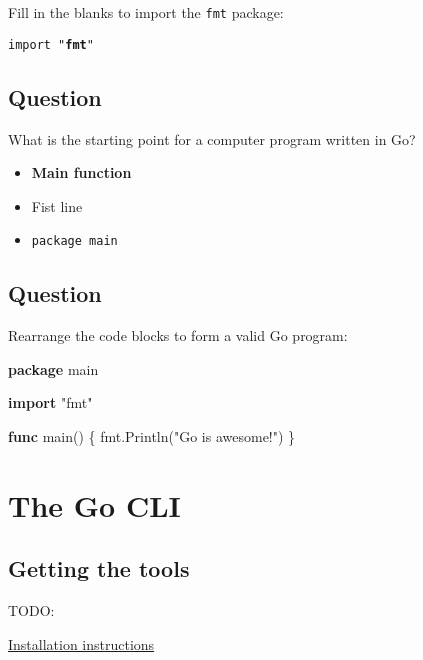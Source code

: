 \documentclass[]{book}
\newenvironment{Shaded}{\begin{snugshade}}{\end{snugshade}}
\newcommand{\KeywordTok}[1]{\textcolor[rgb]{0.13,0.29,0.53}{\textbf{#1}}}
\newcommand{\NormalTok}[1]{#1}
\newcommand{\StringTok}[1]{\textcolor[rgb]{0.31,0.60,0.02}{#1}}
\providecommand{\tightlist}{%
  \setlength{\itemsep}{0pt}\setlength{\parskip}{0pt}}
\begin{document}
Fill in the blanks to import the \texttt{fmt} package:

\texttt{import\ "}\textbf{\texttt{fmt}}\texttt{"}

\hypertarget{question-3}{%
\subsection*{Question}\label{question-3}}

What is the starting point for a computer program written in Go?

\begin{itemize}
\tightlist
\item
  \textbf{Main function}
\item
  Fist line
\item
  \texttt{package\ main}
\end{itemize}

\hypertarget{question-4}{%
\subsection*{Question}\label{question-4}}

Rearrange the code blocks to form a valid Go program:

\begin{Shaded}
\begin{Highlighting}[]
\KeywordTok{package}\NormalTok{ main}

\KeywordTok{import} \StringTok{"fmt"}

\KeywordTok{func}\NormalTok{ main() \{}
\NormalTok{    fmt.Println(}\StringTok{"Go is awesome!"}\NormalTok{)}
\NormalTok{\}}
\end{Highlighting}
\end{Shaded}

\hypertarget{the-go-cli}{%
\section{The Go CLI}\label{the-go-cli}}

\hypertarget{getting-the-tools}{%
\subsection{Getting the tools}\label{getting-the-tools}}

TODO:

\href{https://golang.org/doc/install}{Installation instructions}
\end{document}
